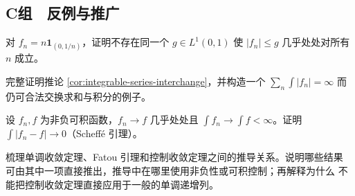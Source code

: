 \subsection*{C组　反例与推广}
\begin{enumerate}[label=\textbf{\thechapter.\arabic*.},resume]
对 \(f_n=n\mathbf1_{(0,1/n)}\)，证明不存在同一个
\(g\in L^1(0,1)\) 使 \(|f_n|\le g\) 几乎处处对所有 \(n\) 成立。

完整证明推论 \ref{cor:integrable-series-interchange}，并构造一个
\(\sum_n\int|f_n|=\infty\) 而仍可合法交换求和与积分的例子。

设 \(f_n,f\) 为非负可积函数，\(f_n\to f\) 几乎处处且
\(\int f_n\to\int f<\infty\)。证明
\(\int|f_n-f|\to0\)（Scheffé 引理）。

梳理单调收敛定理、Fatou 引理和控制收敛定理之间的推导关系。说明哪些结果
可由其中一项直接推出，推导中在哪里使用非负性或可积控制；再解释为什么
不能把控制收敛定理直接应用于一般的单调递增列。
\end{enumerate}
